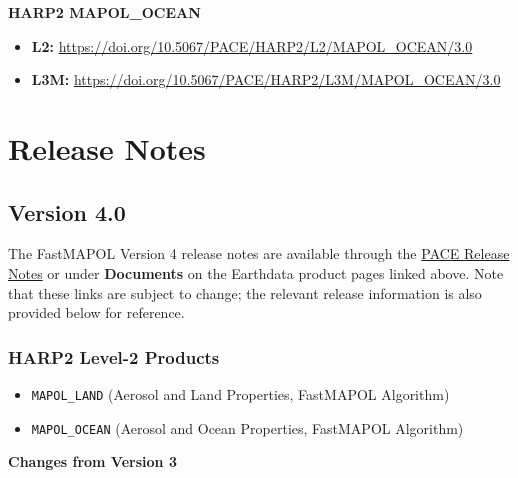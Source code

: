 \documentclass[
  11pt,
  letterpaper,
]{scrreprt}
\providecommand{\tightlist}{%
  \setlength{\itemsep}{0pt}\setlength{\parskip}{0pt}}
\begin{document}
\textbf{HARP2 MAPOL\_OCEAN}

\begin{itemize}
\tightlist
\item
  \textbf{L2:}
  \url{https://doi.org/10.5067/PACE/HARP2/L2/MAPOL_OCEAN/3.0}
\item
  \textbf{L3M:}
  \url{https://doi.org/10.5067/PACE/HARP2/L3M/MAPOL_OCEAN/3.0}
\end{itemize}


\chapter*{Release Notes}\label{release-notes}


\section*{Version 4.0}\label{version-4.0-1}


The FastMAPOL Version 4 release notes are available through the
\href{https://pace.oceansciences.org/access_pace_data.htm}{PACE Release
Notes} or under \textbf{Documents} on the Earthdata product pages linked
above. Note that these links are subject to change; the relevant release
information is also provided below for reference.

\subsection*{HARP2 Level-2 Products}\label{harp2-level-2-products}

\begin{itemize}
\item
  \texttt{MAPOL\_LAND} (Aerosol and Land Properties, FastMAPOL
  Algorithm)
\item
  \texttt{MAPOL\_OCEAN} (Aerosol and Ocean Properties, FastMAPOL
  Algorithm)
\end{itemize}

\textbf{Changes from Version 3}
\end{document}
